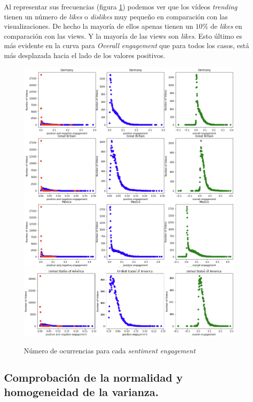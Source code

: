 \documentclass[a4paper,12pt]{article}
\begin{document}
Al representar sus frecuencias (figura \ref{fig:rengan}) podemos ver que los v\'ideos {\itshape trending} tienen un n\'umero de {\itshape likes} o {\itshape dislikes} muy peque\~no en comparaci\'on con las visualizaciones. De hecho la mayor\'ia  de ellos apenas tienen un $10\%$ de {\itshape likes} en comparaci\'on con las views. Y la mayor\'ia de las views son {\itshape likes}. Esto \'ultimo es m\'as evidente en la curva  para {\itshape Overall engagement} que para todos los casos, est\'a m\'as desplazada hacia el lado de los valores positivos.


\begin{figure}[h!]
\centering
\includegraphics[width=13cm]{engagement_1.png}
\includegraphics[width=13cm]{engagement_2.png}
\caption{N\'umero de ocurrencias para cada {\itshape sentiment engagement}}
\label{fig:rengan}
\end{figure}

\subsection{Comprobaci\'on de la normalidad y homogeneidad de la varianza.}
\end{document}
